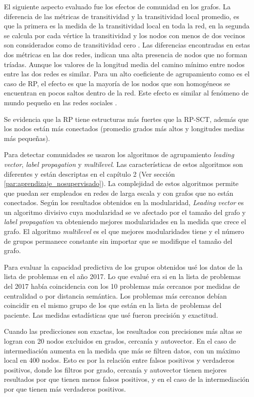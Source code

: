 El siguiente aspecto evaluado fue los efectos de comunidad en los grafos. La diferencia de las métricas de transitividad y la transitividad local promedio, es que la primera es la medida de la transitividad local en toda la red, en la segunda se calcula por cada vértice la transitividad y los nodos con menos de dos vecinos son considerados como de transitividad cero \cite{Watts1998}. Las diferencias encontradas en  estas dos métricas en las dos redes, indican una alta presencia de nodos que no forman tríadas. Aunque los valores de la longitud media del camino mínimo entre nodos entre las dos redes es similar. Para un alto coeficiente de agrupamiento como es el caso de \acrshort{RP}, el efecto es que la mayoría de los nodos que son homogéneos se encuentran en pocos saltos dentro de la red. Este efecto es similar al fenómeno de mundo pequeño en las redes sociales \cite{Cook2006}. 

Se evidencia que la \acrshort{RP} tiene estructuras más fuertes que la \acrshort{RP-SCT}, además que los nodos están más conectados (promedio grados más altos y longitudes medias más pequeñas). 

Para detectar comunidades se usaron los  algoritmos de agrupamiento \textit{leading vector}, \textit{label propagation} y \textit{multilevel}. Las características de estos algoritmos son diferentes y están descriptas en el capítulo 2 (Ver sección \ref{par:aprendizaje_nosupervisado}). La complejidad de estos algoritmos permite que puedan ser empleados en redes de larga escala y con grafos que no están conectados. Según los resultados obtenidos en la modularidad, \textit{Leading vector} es un algoritmo divisivo cuya modularidad se ve afectado por el tamaño del grafo y \textit{label propagation} va obteniendo mejores modularidades en la medida que crece el grafo. El algoritmo \textit{multilevel} es el que mejores modularidades tiene y el número de grupos permanece constante sin importar que se modifique el tamaño del grafo.

Para evaluar la capacidad predictiva de los grupos obtenidos usé los datos de la lista de problemas en el año 2017. Lo que evalué era si en la lista de problemas del 2017 había coincidencia con los 10  problemas más cercanos por medidas de centralidad o por distancia semántica. Los problemas más cercanos debían coincidir en el mismo grupo de los que están en la lista de problemas del paciente. Las medidas estadísticas que usé fueron precisión y exactitud. 

Cuando las predicciones son exactas, los resultados con precisiones más altas se logran con 20 nodos excluidos en grados, cercanía y autovector. En el caso de intermediación aumenta en la medida que más se filtren datos, con un máximo local en 400 nodos. Esto es por la relación entre falsos positivos y verdaderos positivos,  donde los filtros por grado, cercanía y autovector tienen mejores resultados por que tienen menos falsos positivos, y en el caso de la intermediación por que tienen más verdaderos positivos. 


